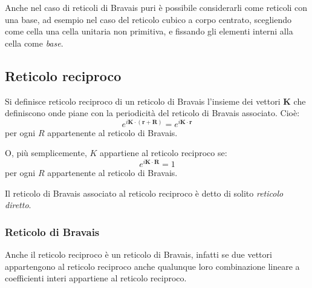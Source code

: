Anche nel caso di reticoli di Bravais puri è possibile considerarli come reticoli con una base, ad esempio nel caso del reticolo cubico a corpo centrato, scegliendo come cella una cella unitaria non primitiva, e fissando gli elementi interni alla cella come \textit{base}.


\subsection{Reticolo reciproco}

\begin{defn}
	Si definisce reticolo reciproco di un reticolo di Bravais l'insieme dei vettori $ \textbf{K} $ che definiscono onde piane con la periodicità del reticolo di Bravais associato. Cioè:
	\[ e^{i\textbf{K}\cdot (\textbf{r} + \textbf{R})} = e^{i\textbf{K}\cdot \textbf{r}} \]
	per ogni $ R $ appartenente al reticolo di Bravais.
	
	O, più semplicemente, $ K $ appartiene al reticolo reciproco se:
	\[ e^{i\textbf{K}\cdot \textbf{R}} = 1 \]
	per ogni $ R $ appartenente al reticolo di Bravais.
\end{defn}

Il reticolo di Bravais associato al reticolo reciproco è detto di solito \textit{reticolo diretto}.

\subsubsection{Reticolo di Bravais}

Anche il reticolo reciproco è un reticolo di Bravais, infatti se due vettori appartengono al reticolo reciproco anche qualunque loro combinazione lineare a coefficienti interi appartiene al reticolo reciproco.

